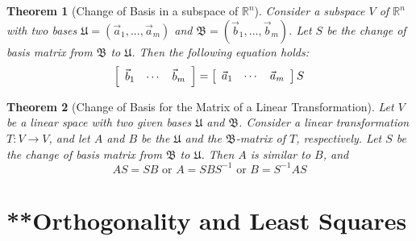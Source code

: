 \documentclass[10pt]{report}
\newtheorem{thm2}{Theorem}[section]
\begin{document}
\begin{thm2}[Change of Basis in a subspace of $\mathbb{R}^n$]
Consider a subspace $V$ of $\mathbb{R}^n$ with two bases $\mathfrak{U} = (\vec{a}_1,...,\vec{a}_m)$ and $\mathfrak{B} = (\vec{b}_1,...,\vec{b}_m)$. Let $S$ be the change of basis matrix from $\mathfrak{B}$ to $\mathfrak{U}$. Then the following equation holds:
$$\left[ \begin{array}{c c c}
\vec{b}_1 & \cdots & \vec{b}_m
\end{array}\right] = \left[ \begin{array}{c c c}
\vec{a}_1 & \cdots & \vec{a}_m
\end{array}\right]S$$
\end{thm2}
\begin{thm2}[Change of Basis for the Matrix of a Linear Transformation]
Let $V$ be a linear space with two given bases $\mathfrak{U}$ and $\mathfrak{B}$. Consider a linear transformation $T:V\to V$, and let $A$ and $B$ be the $\mathfrak{U}$ and the $\mathfrak{B}$-matrix of $T$, respectively. Let $S$ be the change of basis matrix from $\mathfrak{B}$ to $\mathfrak{U}$. Then $A$ is similar to $B$, and 
$$AS = SB \text{  or  } A = SBS^{-1} \text{  or  } B = S^{-1}AS$$
\end{thm2}

\chapter{**Orthogonality and Least Squares}
\end{document}
